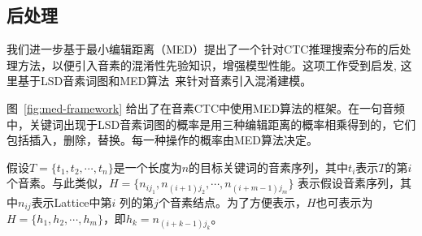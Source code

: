 \subsection{后处理}
\label{Sec:post-process-ctc}

我们进一步基于最小编辑距离（MED）提出了一个针对CTC推理搜索分布的后处理方法，以便引入音素的混淆性先验知识，增强模型性能。这项工作受到\cite{chaudhari2007improvements}启发, 这里基于LSD音素词图和MED算法~\cite{7736093}来针对音素引入混淆建模。 

图~\ref{fig:med-framework} 给出了在音素CTC中使用MED算法的框架。在一句音频中，关键词出现于LSD音素词图的概率是用三种编辑距离的概率相乘得到的，它们包括插入，删除，替换。每一种操作的概率由MED算法决定。


假设$T=\{t_{1}, t_{2},\cdots,t_{n}\}$是一个长度为$n$的目标关键词的音素序列，其中$t_{i}$表示$T$的第$i$个音素。与此类似，$H=\{n_{ij_{1}},n_{(i+1)j_{2}},\cdots,n_{(i+m-1)j_{m}}\}$ 表示假设音素序列，其中$n_{ij}$表示Lattice中第$i$ 列的第$j$个音素结点。为了方便表示，$H$也可表示为$H=\{h_{1},h_{2},\cdots,h_{m}\}$，即$h_{k}=n_{(i+k-1)j_{k}}$。


